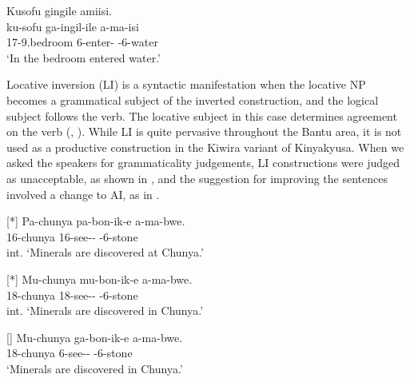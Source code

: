 \documentclass[output=paper]{langscibook}
\begin{document}
\ex
\label{bkm:Ref122598826:b}
Kusofu gingile amiisi.\\
\gll
ku-sofu  ga-ingil-ile  a-ma-isi\\
17-9.bedroom  6\SM{}-enter-\PFV{}  \AUG{}-6-water\\
\glt
‘In the bedroom entered water.’ \citep[158]{MsovelaEtAl2023}\\

\z
\z

Locative inversion (LI) is a syntactic manifestation when the locative NP becomes a grammatical subject of the inverted construction, and the logical subject follows the verb. The locative subject in this case determines agreement on the verb
(\citealt[2]{BresnanKanerva1989}, \citealt[336]{Thwala2006}). While LI is quite pervasive throughout the Bantu area, it is not used as a productive construction in the Kiwira variant of Kinyakyusa. When we asked the speakers for grammaticality judgements, LI constructions were judged as unacceptable, as shown in , and the suggestion for improving the sentences involved a change to AI, as in .

\ea
\label{bkm:Ref122598852}
\ea
[*]{
\label{bkm:Ref122598852:a}
\gll
Pa-chunya  pa-bon-ik-e  a-ma-bwe.\\
16-chunya  16\SM{}-see-\STAT{}-\PFV{}  \AUG{}-6-stone\\
\glt
int. ‘Minerals are discovered at Chunya.’\\
}

\ex
[*]{
\label{bkm:Ref122598852:b}
\gll
Mu-chunya  mu-bon-ik-e  a-ma-bwe.\\
18-chunya  18\SM{}-see-\STAT{}-\PFV{}  \AUG{}-6-stone\\
\glt
int. ‘Minerals are discovered in Chunya.’\\
}

\ex
[]{
\label{bkm:Ref122598852:c}
\gll
Mu-chunya  ga-bon-ik-e  a-ma-bwe.\\
18-chunya  6\SM{}-see-\STAT{}-\PFV{}  \AUG{}-6-stone\\
\glt
‘Minerals are discovered in Chunya.’ \citep[161]{MsovelaEtAl2023}\\
}
\end{document}
